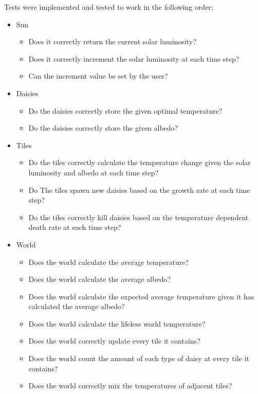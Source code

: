 \documentclass[12pt]{article}
\begin{document}
Tests were implemented and tested to work in the following order:
\begin{itemize}
\item Sun
  \begin{itemize}
  \item Does it correctly return the current solar luminosity?
  \item Does it correctly increment the solar luminosity at each time step?
  \item Can the increment value be set by the user?
  \end{itemize}
\item Daisies
  \begin{itemize}
  \item Do the daisies correctly store the given optimal temperature?
  \item Do the daisies correctly store the given albedo?
  \end{itemize}
\item Tiles
  \begin{itemize}
  \item Do the tiles correctly calculate the temperature change
    given the solar luminosity and albedo at each time step?
  \item Do The tiles spawn new daisies based on the growth rate at
    each time step?
  \item Do the tiles correctly kill daisies based on the temperature
    dependent death rate at each time step?
  \end{itemize}
\item World
  \begin{itemize}
  \item Does the world calculate the average temperature?
  \item Does the world calculate the average albedo?
  \item Does the world calculate the expected average temperature
    given it has calculated the average albedo?
  \item Does the world calculate the lifeless world temperature?
  \item Does the world correctly update every tile it contains?
  \item Does the world count the amount of each type of daisy at every
    tile it contains?
  \item Does the world correctly mix the temperatures of adjacent tiles?
  \end{itemize}
\end{itemize}
\end{document}
